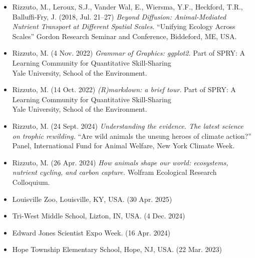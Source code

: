 
\begin{itemize}
  \item \textcolor{awesome}{Rizzuto, M.}, Leroux, S.J., Vander Wal, E., Wiersma, Y.F., Heckford, T.R., Balluffi-Fry, J. (2018, Jul. 21--27) \emph{Beyond Diffusion: Animal-Mediated Nutrient Transport at Different Spatial Scales.} ``Unifying Ecology Across Scales'' Gordon Research Seminar and Conference, Biddeford, ME, USA.
\end{itemize}


\begin{itemize}
  \item \textcolor{awesome}{Rizzuto, M.} (4 Nov. 2022) \emph{Grammar of Graphics: ggplot2.} Part of SPRY: A Learning Community for Quantitative Skill-Sharing\\ Yale University, School of the Environment.
  \item \textcolor{awesome}{Rizzuto, M.} (14 Oct. 2022) \emph{(R)markdown: a brief tour.} Part of SPRY: A Learning Community for Quantitative Skill-Sharing\\ Yale University, School of the Environment.
\end{itemize}


\begin{itemize}
  \item \textcolor{awesome}{Rizzuto, M.} (24 Sept. 2024) \emph{Understanding the evidence. The latest science on trophic rewilding.} ``Are wild animals the unsung heroes of climate action?'' Panel, International Fund for Animal Welfare, New York Climate Week.
\end{itemize}
\begin{itemize}
  \item \textcolor{awesome}{Rizzuto, M.} (26 Apr. 2024) \emph{How animals shape our world: ecosystems, nutrient cycling, and carbon capture.} Wolfram Ecological Research Colloquium.
\end{itemize}


\begin{itemize}
  \item Louisville Zoo, Louisville, KY, USA. (30 Apr. 2025) 
  \item Tri-West Middle School, Lizton, IN, USA. (4 Dec. 2024)
  \item Edward Jones Scientist Expo Week. (16 Apr. 2024)
  \item Hope Township Elementary School, Hope, NJ, USA. (22 Mar. 2023)
\end{itemize}

